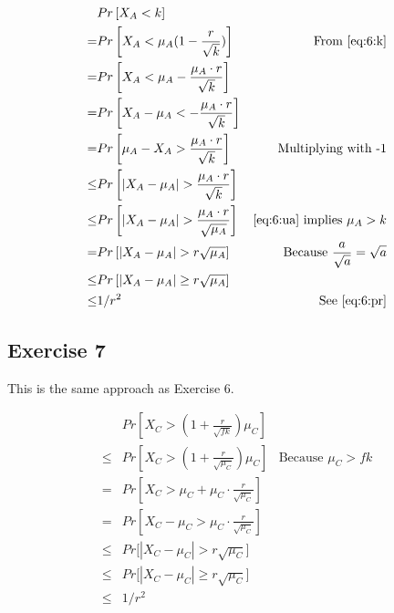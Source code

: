 \begin{align*}
	 & Pr\left[X_A < k\right] & \\
	=& Pr\left[X_A < \mu_A(1-\frac{r}{\sqrt{k}})\right] & \text{From \eqref{eq:6:k}} \\
	=& Pr\left[X_A < \mu_A - \frac{\mu_A \cdot r}{\sqrt{k}}\right] & \\
	=& Pr\left[X_A - \mu_A < -\frac{\mu_A \cdot r}{\sqrt{k}} \right] & \\
	=& Pr\left[\mu_A - X_A > \frac{\mu_A \cdot r}{\sqrt{k}} \right] & \text{Multiplying with -1} \\
	\leq & Pr\left[|X_A - \mu_A| > \frac{\mu_A \cdot r}{\sqrt{k}} \right] 
		& \\
	\leq & Pr\left[|X_A - \mu_A| > \frac{\mu_A \cdot r}{\sqrt{\mu_A}} \right]
		& \text{\eqref{eq:6:ua} implies $\mu_A > k$} \\
	=& Pr\left[|X_A - \mu_A| > r \sqrt{\mu_A} \right]
		& \text{Because $\frac{a}{\sqrt{a}} = \sqrt{a}$}\\
	\leq & Pr\left[|X_A - \mu_A| \geq r \sqrt{\mu_A} \right]
		& \\
	\leq & 1/r^2 & \text{See \eqref{eq:6:pr}}
\end{align*}

\subsection{Exercise 7}
This is the same approach as Exercise 6.

\begin{align*}
	& Pr\left[ X_C > (1+\frac{r}{\sqrt{fk}}) \mu_C \right] & \\
	\leq & Pr\left[ X_C > (1+\frac{r}{\sqrt{\mu_C}}) \mu_C \right]
		& \text{Because $\mu_C > fk$} \\
	=& Pr\left[ X_C > \mu_C + \mu_C \cdot \frac{r}{\sqrt{\mu_C}} \right]
		& \\
	=& Pr\left[ X_C - \mu_C > \mu_C \cdot \frac{r}{\sqrt{\mu_C}} \right]
		& \\
	\leq& Pr\Big[ | X_C - \mu_C | > r \sqrt{\mu_C} \Big]
		& \\
	\leq& Pr\Big[ | X_C - \mu_C | \geq r \sqrt{\mu_C} \Big]
		& \\
	\leq& 1/r^2
\end{align*}